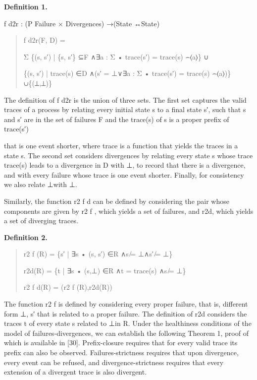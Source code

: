 \documentclass[11pt]{article}
\begin{document}
\noindent\textbf{Definition 1.}


f d2r : (P Failure × Divergences) →(State ↔State)

\begin{quote}\small\raggedright
f d2r(F, D) =
\par
Σ \{(s, s′) | \{s, s′\} ⊆F ∧∃a : Σ • trace(s′) = trace(s) ⌢⟨a⟩\} ∪
\par
\{(s, s′) | trace(s) ∈D ∧(s′ = ⊥∨∃a : Σ • trace(s′) = trace(s) ⌢⟨a⟩)\} ∪\{(⊥,⊥)\}
\end{quote}

The definition of f d2r is the union of three sets. The first set captures the valid traces of a process by relating every initial state s to a final state s′, such that s and s′ are in the set of failures F and the trace(s) of s is a proper prefix of trace(s′)

that is one event shorter, where trace is a function that yields the traces in a state s. The second set considers divergences by relating every state s whose trace trace(s) leads to a divergence in D with ⊥, to record that there is a divergence, and with every failure whose trace is one event shorter. Finally, for consistency we also relate ⊥with ⊥.

Similarly, the function r2 f d can be defined by considering the pair whose components are given by r2 f , which yields a set of failures, and r2d, which yields a set of diverging traces.

\noindent\textbf{Definition 2.}


\begin{quote}\small\raggedright
r2 f (R) = \{s′ | ∃s • (s, s′) ∈R ∧s ̸= ⊥∧s′ ̸= ⊥\}
\par
r2d(R) = \{t | ∃s • (s,⊥) ∈R ∧t = trace(s) ∧s ̸= ⊥\}
\par
r2 f d(R) = (r2 f (R),r2d(R))
\end{quote}

The function r2 f is defined by considering every proper failure, that is, different form ⊥, s′ that is related to a proper failure. The definition of r2d considers the traces t of every state s related to ⊥in R. Under the healthiness conditions of the model of failures-divergences, we can establish the following Theorem 1, proof of which is available in [30]. Prefix-closure requires that for every valid trace its prefix can also be observed. Failures-strictness requires that upon divergence, every event can be refused, and divergence-strictness requires that every extension of a divergent trace is also divergent.
\end{document}

